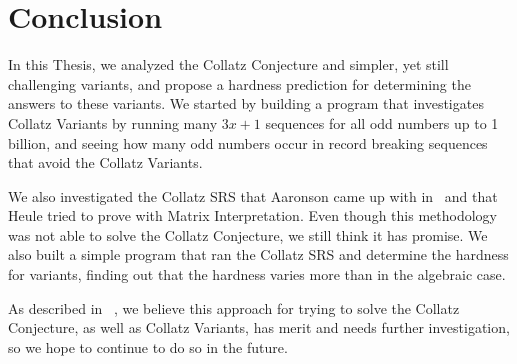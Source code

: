 \chapter{Conclusion} \label{sec:conclusion}
In this Thesis, we analyzed the Collatz Conjecture and simpler, yet still challenging variants, and propose a hardness prediction for determining the answers to these variants. We started by building a program that investigates Collatz Variants by running many $3x+1$ sequences for all odd numbers up to 1 billion, and seeing how many odd numbers occur in record breaking sequences that avoid the Collatz Variants. \par
We also investigated the Collatz SRS that Aaronson came up with in~\cite{HeuleAaronson} and that Heule tried to prove with Matrix Interpretation. Even though this methodology was not able to solve the Collatz Conjecture, we still think it has promise. We also built a simple program that ran the Collatz SRS and determine the hardness for variants, finding out that the hardness varies more than in the algebraic case.\par
As described in ~\cite{HeuleAaronson}, we believe this approach for trying to solve the Collatz Conjecture, as well as Collatz Variants, has merit and needs further investigation, so we hope to continue to do so in the future.